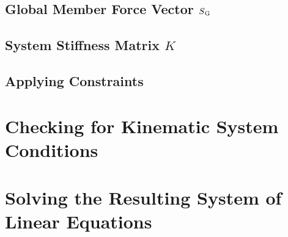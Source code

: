 \subsection{Global Member Force Vector $S\textsubscript{G}$}
\label{sec:asmSG}
\subsection{System Stiffness Matrix $K$}
\label{sec:asmK}

\subsection{Applying Constraints}
\label{sec:applyconst}


\section{Checking for Kinematic System Conditions}
\label{sec:kinesyscheck}


\section{Solving the Resulting System of Linear Equations}
\label{sec:solver}
